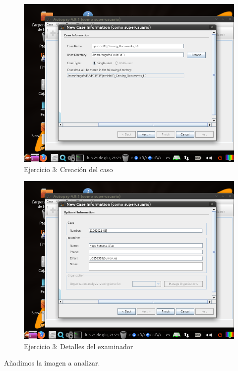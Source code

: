 \documentclass[11pt]{article}
\begin{document}
\begin{figure}[H]
    \caption{Ejercicio 3: Creación del caso}
    \centering
    \includegraphics[scale=0.7]{e3-1.png}
\end{figure}

\begin{figure}[H]
    \caption{Ejercicio 3: Detalles del examinador}
    \centering
    \includegraphics[scale=0.7]{e3-2.png}
\end{figure}

Añadimos la imagen a analizar.
\end{document}
